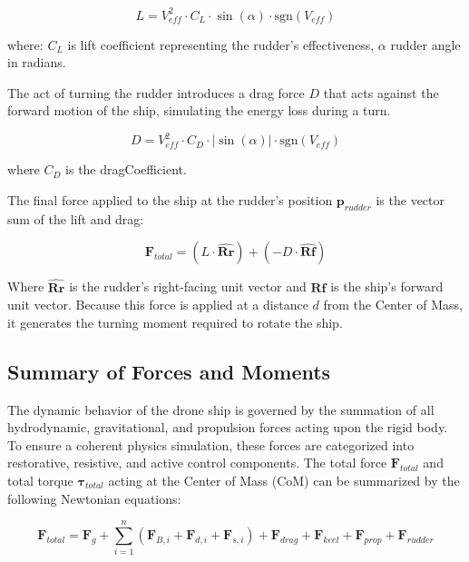 \begin{equation}
L = V_{eff}^2 \cdot C_L \cdot \sin(\alpha) \cdot \text{sgn}(V_{eff})
\end{equation}

where: $C_L$ is  lift coefficient representing the rudder's effectiveness, $\alpha$ rudder angle in radians.

The act of turning the rudder introduces a drag force $D$ that acts against the forward motion of the ship, simulating the energy loss during a turn.

\begin{equation}
D = V_{eff}^2 \cdot C_D \cdot |\sin(\alpha)| \cdot \text{sgn}(V_{eff})
\end{equation}

where $C_D$ is the dragCoefficient.


The final force applied to the ship at the rudder's position $\mathbf{p}_{rudder}$ is the vector sum of the lift and drag:

\begin{equation}
\mathbf{F}_{total} = (L \cdot \mathbf{\hat{Rr}}) + (-D \cdot \mathbf{\hat{Rf}})
\end{equation}

Where $\mathbf{\hat{Rr}}$ is the rudder’s right-facing unit vector and $\mathbf{\hat{Rf}}$ is the ship’s forward unit vector. Because this force is applied at a distance $d$ from the Center of Mass, it generates the turning moment required to rotate the ship.





\subsection{Summary of Forces and Moments}

The dynamic behavior of the drone ship is governed by the summation of all hydrodynamic, gravitational, and propulsion forces acting upon the rigid body. To ensure a coherent physics simulation, these forces are categorized into restorative, resistive, and active control components. The total force $\mathbf{F}_{total}$ and total torque $\mathbf{\tau}_{total}$ acting at the Center of Mass (CoM) can be summarized by the following Newtonian equations:

\begin{equation}
    \mathbf{F}_{total} = \mathbf{F}_g + \sum_{i=1}^{n} \left( \mathbf{F}_{B,i} + \mathbf{F}_{d,i} + \mathbf{F}_{s,i} \right) + \mathbf{F}_{drag} + \mathbf{F}_{keel} + \mathbf{F}_{prop} + \mathbf{F}_{rudder}
\end{equation}

